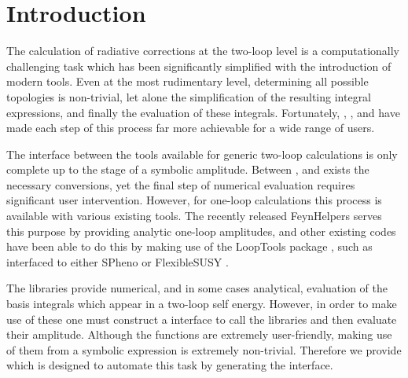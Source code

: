 

\section{Introduction}

The calculation of radiative corrections at the two-loop level is a computationally challenging task which has been significantly simplified with the introduction of modern tools.  Even at the most rudimentary level, determining all possible topologies is non-trivial, let alone the simplification of the resulting integral expressions, and finally the evaluation of these integrals.  Fortunately, \feynarts \cite{Hahn2000}, \feyncalc \cite{Mertig1991,Shtabovenko2016}, \tarcer \cite{Mertig1998} and \tsil \cite{Martin2006} have made each step of this process far more achievable for a wide range of users.

The interface between the tools available for generic two-loop calculations is only complete up to the stage of a symbolic amplitude.   Between \feynartss, \feyncalc and \tarcer exists the necessary conversions, yet the final step of numerical evaluation requires significant user intervention.  However, for one-loop calculations this process is available with various existing tools.  The recently released \textsf{FeynHelpers} \cite{Shtabovenko} serves this purpose by providing analytic one-loop amplitudes, and other existing codes have been able to do this by making use of the \textsf{LoopTools} package \cite{LoopTools}, such as \sarah \cite{Staub2014,Staub2015} interfaced to either \textsf{SPheno} \cite{Porod2003} or \textsf{FlexibleSUSY} \cite{Athron2015}.

The \tsil libraries provide numerical, and in some cases analytical, evaluation of the basis integrals which appear in a two-loop self energy.  However, in order to make use of these one must construct a \CC interface to call the \tsil libraries and then evaluate their amplitude.  Although the \tsil functions are extremely user-friendly, making use of them from a symbolic \mathematica expression is extremely non-trivial.  Therefore we provide \mb which is designed to automate this task by generating the \CC interface.

